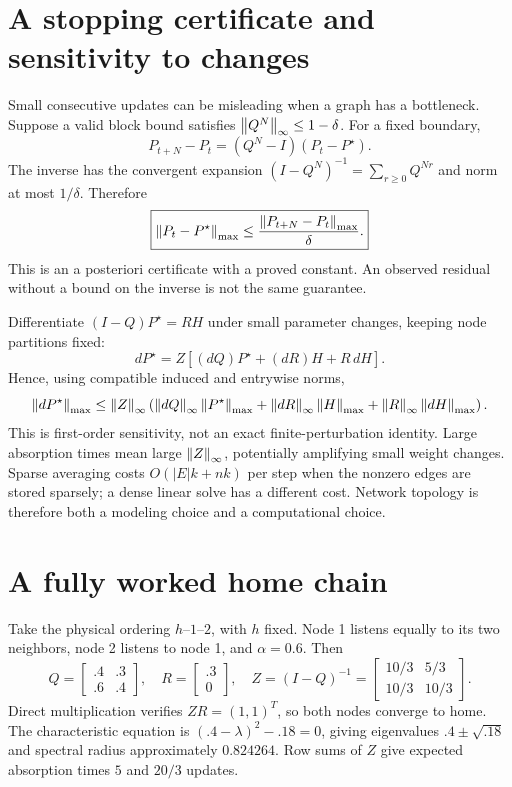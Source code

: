 \documentclass[12pt]{article}
\newcommand{\page}[1]{\section{#1}}
\begin{document}
\page{A stopping certificate and sensitivity to changes}
Small consecutive updates can be misleading when a graph has a bottleneck. Suppose a valid block bound satisfies $\left\lVert Q^N\right\rVert_\infty\leq1-\delta$. For a fixed boundary,
\begin{equation}P_{t+N}-P_t=(Q^N-I)(P_t-P^\star).\end{equation}
The inverse has the convergent expansion $(I-Q^N)^{-1}=\sum_{r\geq0}Q^{Nr}$ and norm at most $1/\delta$. Therefore
\begin{equation}\boxed{\left\lVert P_t-P^\star\right\rVert_{\max}\leq\frac{\left\lVert P_{t+N}-P_t\right\rVert_{\max}}{\delta}.}\end{equation}
This is an a posteriori certificate with a proved constant. An observed residual without a bound on the inverse is not the same guarantee.

Differentiate $(I-Q)P^\star=RH$ under small parameter changes, keeping node partitions fixed:
\begin{equation}dP^\star=Z\left[(dQ)P^\star+(dR)H+R\,dH\right].\end{equation}
Hence, using compatible induced and entrywise norms,
\begin{equation}\left\lVert dP^\star\right\rVert_{\max}\leq\left\lVert Z\right\rVert_\infty\left(\left\lVert dQ\right\rVert_\infty\left\lVert P^\star\right\rVert_{\max}+\left\lVert dR\right\rVert_\infty\left\lVert H\right\rVert_{\max}+\left\lVert R\right\rVert_\infty\left\lVert dH\right\rVert_{\max}\right).\end{equation}
This is first-order sensitivity, not an exact finite-perturbation identity. Large absorption times mean large $\left\lVert Z\right\rVert_\infty$, potentially amplifying small weight changes. Sparse averaging costs $O(|E|k+nk)$ per step when the nonzero edges are stored sparsely; a dense linear solve has a different cost. Network topology is therefore both a modeling choice and a computational choice.

\page{A fully worked home chain}
Take the physical ordering $h$--$1$--$2$, with $h$ fixed. Node 1 listens equally to its two neighbors, node 2 listens to node 1, and $\alpha=0.6$. Then
\begin{equation}Q=\begin{bmatrix}.4&.3\\.6&.4\end{bmatrix},\quad R=\begin{bmatrix}.3\\0\end{bmatrix},\quad Z=(I-Q)^{-1}=\begin{bmatrix}10/3&5/3\\10/3&10/3\end{bmatrix}.\end{equation}
Direct multiplication verifies $ZR=(1,1)^T$, so both nodes converge to home. The characteristic equation is $(.4-\lambda)^2-.18=0$, giving eigenvalues $.4\pm\sqrt{.18}$ and spectral radius approximately $0.824264$. Row sums of $Z$ give expected absorption times $5$ and $20/3$ updates.
\end{document}
